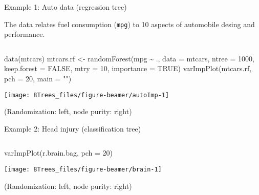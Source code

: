 \documentclass[
  10pt,
  ignorenonframetext,
]{beamer}
\newenvironment{Shaded}{\begin{snugshade}}{\end{snugshade}}
\newcommand{\AttributeTok}[1]{\textcolor[rgb]{0.77,0.63,0.00}{#1}}
\newcommand{\ConstantTok}[1]{\textcolor[rgb]{0.00,0.00,0.00}{#1}}
\newcommand{\DecValTok}[1]{\textcolor[rgb]{0.00,0.00,0.81}{#1}}
\newcommand{\FunctionTok}[1]{\textcolor[rgb]{0.00,0.00,0.00}{#1}}
\newcommand{\NormalTok}[1]{#1}
\newcommand{\OtherTok}[1]{\textcolor[rgb]{0.56,0.35,0.01}{#1}}
\newcommand{\SpecialCharTok}[1]{\textcolor[rgb]{0.00,0.00,0.00}{#1}}
\newcommand{\StringTok}[1]{\textcolor[rgb]{0.31,0.60,0.02}{#1}}
\begin{document}
\begin{frame}[fragile]
\begin{block}{Example 1: Auto data (regression tree)}
\protect\hypertarget{example-1-auto-data-regression-tree}{}
\vspace{1mm}

The data relates fuel consumption (\texttt{mpg}) to 10 aspects of
automobile desing and performance.

\vspace{2mm}

\(~\)

\scriptsize

\begin{Shaded}
\begin{Highlighting}[]
\FunctionTok{data}\NormalTok{(mtcars)}
\NormalTok{mtcars.rf }\OtherTok{\textless{}{-}} \FunctionTok{randomForest}\NormalTok{(mpg }\SpecialCharTok{\textasciitilde{}}\NormalTok{ ., }\AttributeTok{data =}\NormalTok{ mtcars, }\AttributeTok{ntree =} \DecValTok{1000}\NormalTok{, }\AttributeTok{keep.forest =} \ConstantTok{FALSE}\NormalTok{,}
    \AttributeTok{mtry =} \DecValTok{10}\NormalTok{, }\AttributeTok{importance =} \ConstantTok{TRUE}\NormalTok{)}
\FunctionTok{varImpPlot}\NormalTok{(mtcars.rf, }\AttributeTok{pch =} \DecValTok{20}\NormalTok{, }\AttributeTok{main =} \StringTok{""}\NormalTok{)}
\end{Highlighting}
\end{Shaded}

\begin{center}\texttt{[image: 8Trees\_files/figure-beamer/autoImp-1]} \end{center}

(Randomization: left, node purity: right)
\end{block}
\end{frame}

\begin{frame}[fragile]
\begin{block}{Example 2: Head injury (classification tree)}
\protect\hypertarget{example-2-head-injury-classification-tree}{}
\vspace{1mm}

\(~\)

\scriptsize

\begin{Shaded}
\begin{Highlighting}[]
\FunctionTok{varImpPlot}\NormalTok{(r.brain.bag, }\AttributeTok{pch =} \DecValTok{20}\NormalTok{)}
\end{Highlighting}
\end{Shaded}

\begin{center}\texttt{[image: 8Trees\_files/figure-beamer/brain-1]} \end{center}

(Randomization: left, node purity: right)
\end{block}
\end{frame}
\end{document}
